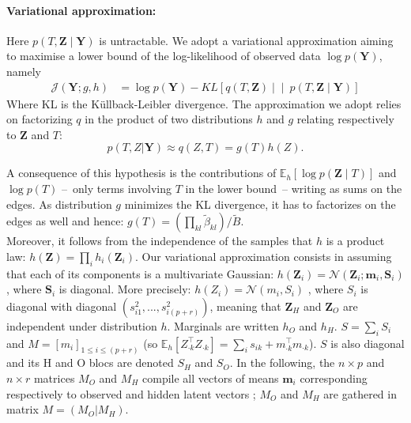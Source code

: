 \documentclass[11pt,a4paper]{article}
\newcommand{\Ybf}{\boldsymbol{Y}}
\newcommand{\Zbf}{\boldsymbol{Z}}
\newcommand{\Sbf}{\boldsymbol{S}}
\newcommand{\mbf}{\boldsymbol{m}}
\newcommand\Ncal{\mathcal{N}}
\newcommand{\Esp}{\mathds{E}}
\begin{document}
\paragraph{Variational approximation:}

Here $p(T,\Zbf \mid \Ybf)$ is untractable. We adopt a variational approximation aiming to maximise a lower bound of the log-likelihood of observed data $\log p(\Ybf)$, namely  
\begin{align*}
    \mathcal{J}(\Ybf; g,h)
    & = \log p(\Ybf) - KL\left[q(T,\Zbf) \middle\vert\middle\vert\ p(T,\Zbf \mid \Ybf)\right]
\end{align*}
Where KL is the Küllback-Leibler divergence. The approximation we adopt relies on factorizing $q$ in the product of two distributions $h$ and $g$ relating respectively to $\Zbf$  and $T$: 
$$p(T,Z | \Ybf) \approx  q(Z,T) = g(T)h(Z).$$

 A consequence of this hypothesis is the contributions of   $\Esp_h[\log p(\Zbf\mid T)]$ and $\log p(T)$ --~only terms involving $T$ in the lower bound~-- writing as sums on the edges. As distribution   $g$ minimizes the KL divergence, it has to factorizes on the edges as well and hence:
$ g(T) = \left(\prod_{kl} \widetilde{\beta}_{kl} \right) / \widetilde{B}$. \\
 
Moreover, it follows from the independence of the samples that $h$ is a product law: $ h(\Zbf) = \prod_i h_i(\Zbf_i)$.
Our variational approximation consists in assuming that each of its components is a multivariate Gaussian: $h(\Zbf_i) = \Ncal(\Zbf_i; \mbf_i, \Sbf_i)$, where $\Sbf_i$ is diagonal. More precisely:  $ h(Z_i) =  \mathcal{N}(m_i,S_i)$ , where $S_i$ is diagonal with diagonal $(s_{i1}^2, ... , s_{i(p+r)}^2)$, meaning that $\Zbf_H$ and $\Zbf_O$ are independent under distribution $h$. Marginals are written $h_O$  and  $h_H$. $S=\sum_i S_i$  and $ M =  [m_i]_{1 \leq i \leq (p+r)}$ (so $\Esp_h[Z_{\cdot k}^\intercal Z_{\cdot k}] = \sum_i s_{ik} + m_{\cdot k}^\intercal m_{\cdot k}$). $S$ is also diagonal and its H and O blocs are denoted $S_H$ and $S_O$. In the following, the $n\times p $ and $n\times r $ matrices $M_O$ and  $M_H$ compile all vectors of means $\mbf_i$ corresponding respectively to observed and hidden latent vectors ; $M_O$ and  $M_H$ are gathered in matrix $M= (M_O | M_H)$.

 
\end{document}
